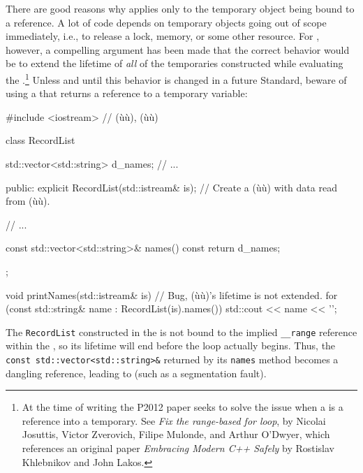 {{{There are good reasons why  applies only to
the temporary object being bound to a reference. A lot of code depends
on temporary objects going out of scope immediately, i.e., to release a
lock, memory, or some other resource. For , however, a compelling argument has been made that
the correct behavior would be to extend the lifetime of \emph{all} of
the temporaries constructed while evaluating the .{\cprotect\footnote{At the time of writing the P2012 paper
seeks to solve the issue when a  is a
reference into a temporary. See \emph{Fix the range-based for loop},
by Nicolai Josuttis, Victor Zverovich, Filipe Mulonde, and Arthur
O'Dwyer, which references an original paper
\emph{Embracing Modern C++ Safely} by Rostislav Khlebnikov and John
  Lakos.}} Unless and until this behavior is changed in a future
Standard, beware of using a  that returns a
reference to a temporary variable:

\begin{emcppslisting}[emcppsbatch=e4]
#include <iostream>  // (ù{}ù), (ù{}ù)

class RecordList
{
    std::vector<std::string> d_names;
    // ...

public:
    explicit RecordList(std::istream& is);
        // Create a (ù{}ù) with data read from (ù{}ù).

    // ...

    const std::vector<std::string>& names() const { return d_names; }
};

void printNames(std::istream& is)
{
    // Bug, (ù{}ù)'s lifetime is not extended.
    for (const std::string& name : RecordList(is).names())
    {
        std::cout << name << '\n';
    }
}
\end{emcppslisting}
    

\noindent The \lstinline!RecordList! constructed in the  is
not bound to the implied \lstinline!__range! reference within the
, so its lifetime will end before
the loop actually begins. Thus, the
\lstinline!const!~\lstinline!std::vector<std::string>&! returned by its
\lstinline!names! method becomes a dangling reference, leading to
 (such as a segmentation fault).

}}}
